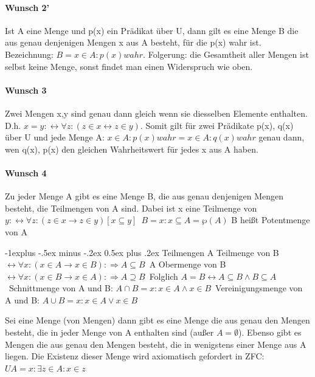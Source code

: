 \documentclass[a4paper]{article}
\makeatletter
\renewcommand{\subsection}{\@startsection{subsection}{2}{0mm}%
                                {-1explus -.5ex minus -.2ex}%
                                {0.5ex plus .2ex}%
                                {\normalfont\normalsize\bfseries}}
\makeatother
\begin{document}
\begin{multicols}{3}
    \paragraph{Wunsch 2'}
    Ist A eine Menge und p(x) ein Prädikat über U, dann gilt es eine Menge B die aus genau denjenigen Mengen x aus A besteht, für die p(x) wahr ist. Bezeichnung: $B={x\in A:p(x) wahr}$.
    Folgerung: die Gesamtheit aller Mengen ist selbst keine Menge, sonst findet man einen Widerspruch wie oben.
    
    \paragraph{Wunsch 3}
    Zwei Mengen x,y sind genau dann gleich wenn sie diesselben Elemente enthalten. D.h. $x=y: \leftrightarrow \forall z:(z\in x \leftrightarrow z\in y)$. Somit gilt für zwei Prädikate p(x), q(x) über U und jede Menge A: ${x\in A: p(x) wahr} = {x\in A: q(x) wahr}$ genau dann, wen q(x), p(x) den gleichen Wahrheitswert für jedes x aus A haben.
    
    \paragraph{Wunsch 4}
    Zu jeder Menge A gibt es eine Menge B, die aus genau denjenigen Mengen besteht, die Teilmengen von A sind. Dabei ist x eine Teilmenge von $y: \leftrightarrow \forall z:(z\in x \rightarrow z \in y) [x \subseteq y]$\
    $B={x:x\subseteq A}=\wp(A)$ B heißt Potentmenge von A\
    
    \subsection{Teilmengen}
    A Teilmenge von B $\leftrightarrow \forall x: (x\in A \rightarrow x \in B):\Rightarrow A\subseteq B$\
    A Obermenge von B $\leftrightarrow \forall x: (x\in B \rightarrow x \in A):\Rightarrow A\supseteq B$\
    Folglich $A=B \leftrightarrow A\subseteq B \wedge B\subseteq A$\
    Schnittmenge von A und B: $A\cap B = {x: x\in A \wedge x\in B}$\
    Vereinigungsmenge von A und B: $A\cup B = {x: x\in A \vee x\in B}$
    
    Sei eine Menge (von Mengen) dann gibt es eine Menge die aus genau den Mengen besteht, die in jeder Menge von A enthalten sind (außer $A=\emptyset$).
    Ebenso gibt es Mengen die aus genau den Mengen besteht, die in wenigstens einer Menge aus A liegen. Die Existenz dieser Menge wird axiomatisch gefordert in ZFC:$ UA = {x: \exists z \in A: x \in z}$\
    

\end{multicols}
\end{document}
